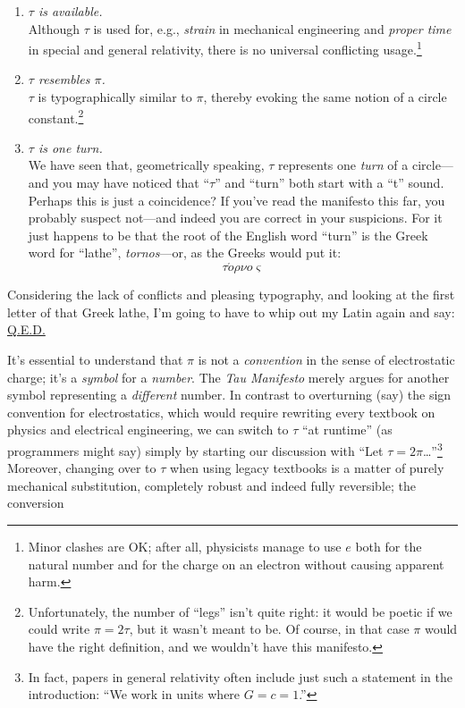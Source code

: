 \documentclass{article}
\begin{document}
\begin{enumerate}
  \item \emph{$\tau$ is available.} \\ Although $\tau$ is used for, e.g., \emph{strain} in mechanical engineering and \emph{proper time} in special and general relativity, there is no universal conflicting usage.\footnote{Minor clashes are OK; after all, physicists manage to use $e$ both for the natural number and for the charge on an electron without causing apparent harm.} 
  
  \item \emph{$\tau$ resembles $\pi$.} \\ $\tau$ is typographically similar to $\pi$, thereby evoking the same notion of a circle constant.\footnote{Unfortunately, the number of ``legs'' isn't quite right: it would be poetic if we could write $\pi = 2\tau$, but it wasn't meant to be. Of course, in that case $\pi$ would have the right definition, and we wouldn't have this manifesto.}
  
  \item \emph{$\tau$ is one turn.} \\ We have seen that, geometrically speaking, $\tau$ represents one \emph{turn} of a circle---and you may have noticed that ``$\tau$'' and ``turn'' both start with a ``t'' sound. Perhaps this is just a coincidence? If you've read the manifesto this far, you probably suspect not---and indeed you are correct in your suspicions. For it just happens to be that the root of the English word ``turn'' is the Greek word for ``lathe'', \emph{tornos}---or, as the Greeks would put it: \[ \tau \acute{o}\rho\nu o\varsigma \] 
\end{enumerate}

Considering the lack of conflicts and pleasing typography, and looking at the first letter of that Greek lathe, I'm going to have to whip out my Latin again and say: \href{http://en.wikipedia.org/wiki/Q.E.D.}{Q.E.D.}



It's essential to understand that $\pi$ is not a \emph{convention} in the sense of electrostatic charge; it's a \emph{symbol} for a \emph{number}. The \emph{Tau Manifesto} merely argues for another symbol representing a \emph{different} number. In contrast to overturning (say) the sign convention for electrostatics, which would require rewriting every textbook on physics and electrical engineering, we can switch to $\tau$ ``at runtime'' (as programmers might say) simply by starting our discussion with ``Let $\tau = 2\pi$\ldots''\footnote{In fact, papers in general relativity often include just such a statement in the introduction: ``We work in units where $G = c = 1$.''} Moreover, changing over to $\tau$ when using legacy textbooks is a matter of purely mechanical substitution, completely robust and indeed fully reversible; the conversion
\end{document}
